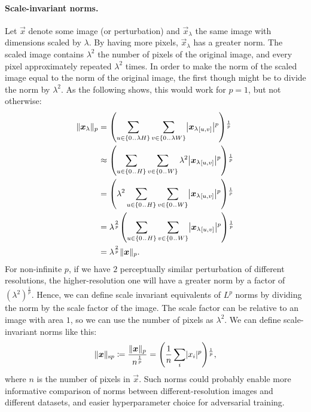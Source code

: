 \documentclass{article}
\begin{document}
\paragraph{Scale-invariant norms.}
Let $\vec x$ denote some image (or perturbation) and $\vec x_\lambda$ the same image with dimensions scaled by $\lambda$. By having more pixels, $\vec x_\lambda$ has a greater norm. The scaled image contains $\lambda^2$ the number of pixels of the original image, and every pixel approximately repeated $\lambda^2$ times. In order to make the norm of the scaled image equal to the norm of the original image, the first though might be to divide the norm by $\lambda^2$. As the following shows, this would work for $p=1$, but not otherwise: 
\begin{align}
    \enVert{\vec x_\lambda}_p 
    &= \del{\sum_{u\in\cbr{0\bidot\lambda H}}\sum_{v\in\cbr{0\bidot\lambda W}} \envert{{\vec x_\lambda}_\ind{u, v}}^p}^{\frac{1}{p}} \\
    &\approx \del{\sum_{u\in\cbr{0\bidot H}}\sum_{v\in\cbr{0\bidot W}} \lambda^2 \envert{{\vec x_\lambda}_\ind{u, v}}^p}^{\frac{1}{p}} \\
    &= \del{\lambda^2\sum_{u\in\cbr{0\bidot H}}\sum_{v\in\cbr{0\bidot W}} \envert{{\vec x_\lambda}_\ind{u, v}}^p}^{\frac{1}{p}} \\
    &= \lambda^\frac{2}{p} \del{\sum_{u\in\cbr{0\bidot H}}\sum_{v\in\cbr{0\bidot W}} \envert{{\vec x_\lambda}_\ind{u, v}}^p}^{\frac{1}{p}} \\
    &= \lambda^\frac{2}{p} \enVert{\vec x}_p \text{.}
\end{align}
For non-infinite $p$, if we have $2$ perceptually similar perturbation of different resolutions, the higher-resolution one will have a greater norm by a factor of $(\lambda^2)^\frac{1}{p}$. Hence, we can define scale invariant equivalents of $L^p$ norms by dividing the norm by the scale factor of the image. The scale factor can be relative to an image with area $1$, so we can use the number of pixels as $\lambda^2$. We can define scale-invariant norms like this:
\begin{align}
    \enVert{\vec x}_{\text{s}p} \coloneqq \frac{\enVert{\vec x}_p}{n^\frac{1}{p}} = \del{\frac{1}{n}\sum_i \envert{x_i}^p}^\frac{1}{p},
\end{align}
where $n$ is the number of pixels in $\vec x$. Such norms could probably enable more informative comparison of norms between different-resolution images and different datasets, and easier hyperparameter choice for adversarial training.
\end{document}
